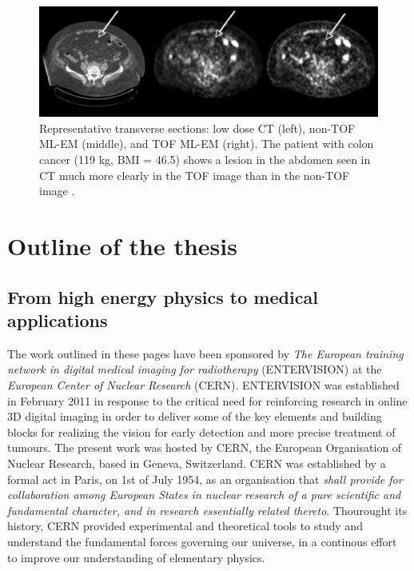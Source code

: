 \begin{figure}  
\centering
\includegraphics[width=14cm]{Pictures/Chapter_1/tof_gain.pdf}
\caption[Improvement of TOF-PET]{Representative transverse sections: low dose CT (left), non-TOF ML-EM (middle), and TOF ML-EM (right). The patient with colon cancer (119 kg, BMI = 46.5) shows a lesion in the abdomen seen in CT much more clearly in the TOF image than in the non-TOF image \cite{Karp2008}.}
\label{fig:tofgain}
\end{figure}

\section{Outline of the thesis}

\subsection{From high energy physics to medical applications}
The work outlined in these pages have been sponsored by \textit{The European training network in digital medical imaging for radiotherapy} (ENTERVISION) at the \textit{European Center of Nuclear Research} (CERN). ENTERVISION was established in February 2011 in response to the critical need for reinforcing research in online 3D digital imaging in order to deliver some of the key elements and building blocks for realizing the vision for early detection and more precise treatment of tumours.
The present work was hosted by CERN, the European Organisation of Nuclear Research, based in Geneva, Switzerland. 
CERN was established by a formal act in Paris, on 1st of July 1954, as an organisation that \textit{shall provide for collaboration among European States in nuclear research of a pure scientific and fundamental character, and in research essentially related thereto}.
Thourought its history, CERN provided experimental and theoretical tools to study and understand the fundamental forces governing our universe, in a continous effort to improve our understanding of elementary  physics. 

